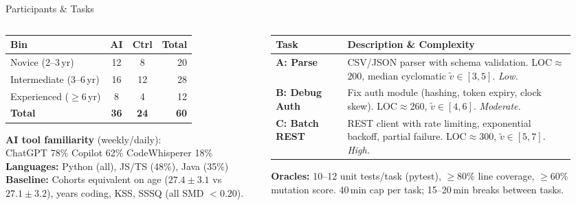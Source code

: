 \documentclass[10pt,aspectratio=169]{beamer}
\begin{document}
\begin{frame}{Participants \& Tasks}
\begin{columns}[T]
\begin{column}{0.48\textwidth}
\begin{keybox}[Participant Profile ($N{=}60$)]
\scriptsize
\renewcommand{\arraystretch}{1.15}
\begin{tabular}{lccr}
\toprule
\textbf{Bin} & \textbf{AI} & \textbf{Ctrl} & \textbf{Total} \\
\midrule
Novice (2--3\,yr) & 12 & 8 & 20 \\
Intermediate (3--6\,yr) & 16 & 12 & 28 \\
Experienced ($\geq$6\,yr) & 8 & 4 & 12 \\
\midrule
\textbf{Total} & \textbf{36} & \textbf{24} & \textbf{60} \\
\bottomrule
\end{tabular}
\vspace{3pt}

\textbf{AI tool familiarity} (weekly/daily):\\
ChatGPT 78\% \textbullet{} Copilot 62\% \textbullet{} CodeWhisperer 18\%\\[2pt]
\textbf{Languages:} Python (all), JS/TS (48\%), Java (35\%)\\
\textbf{Baseline:} Cohorts equivalent on age ($27.4{\pm}3.1$ vs $27.1{\pm}3.2$), years coding, KSS, SSSQ (all SMD $< 0.20$).
\end{keybox}
\end{column}
\begin{column}{0.50\textwidth}
\begin{alertbox}
\scriptsize
\renewcommand{\arraystretch}{1.15}
\begin{tabular}{p{0.22\linewidth}p{0.70\linewidth}}
\toprule
\textbf{Task} & \textbf{Description \& Complexity} \\
\midrule
\textbf{A: Parse} & CSV/JSON parser with schema validation. LOC$\approx$200, median cyclomatic $\tilde{v}{\in}[3,5]$. \textit{Low.} \\
\midrule
\textbf{B: Debug Auth} & Fix auth module (hashing, token expiry, clock skew). LOC$\approx$260, $\tilde{v}{\in}[4,6]$. \textit{Moderate.} \\
\midrule
\textbf{C: Batch REST} & REST client with rate limiting, exponential backoff, partial failure. LOC$\approx$300, $\tilde{v}{\in}[5,7]$. \textit{High.} \\
\bottomrule
\end{tabular}
\vspace{3pt}

\textbf{Oracles:} 10--12 unit tests/task (pytest), $\geq$80\% line coverage, $\geq$60\% mutation score.
40\,min cap per task; 15--20\,min breaks between tasks.
\end{alertbox}
\end{column}
\end{columns}
\end{frame}
\end{document}
